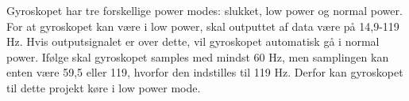 Gyroskopet har tre forskellige power modes: slukket, low power og normal power. For at gyroskopet kan være i low power, skal outputtet af data være på 14,9-119 Hz. Hvis outputsignalet er over dette, vil gyroskopet automatisk gå i normal power. Ifølge  skal gyroskopet samples med mindst 60 Hz, men samplingen kan enten være 59,5 eller 119, hvorfor den indstilles til 119 Hz. Derfor kan gyroskopet til dette projekt køre i low power mode. \citep{STMicroelectronics2016}
